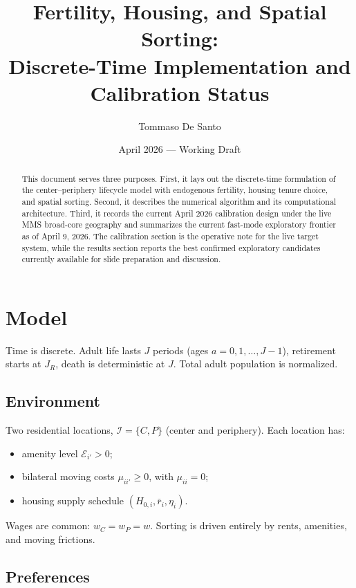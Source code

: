 \documentclass[11pt]{article}
\title{Fertility, Housing, and Spatial Sorting:\\Discrete-Time Implementation and Calibration Status}
\author{Tommaso De Santo}
\date{April 2026 --- Working Draft}
\begin{document}
\maketitle

\begin{abstract}
This document serves three purposes. First, it lays out the discrete-time formulation of the center--periphery lifecycle model with endogenous fertility, housing tenure choice, and spatial sorting. Second, it describes the numerical algorithm and its computational architecture. Third, it records the current April 2026 calibration design under the live MMS broad-core geography and summarizes the current fast-mode exploratory frontier as of April 9, 2026. The calibration section is the operative note for the live target system, while the results section reports the best confirmed exploratory candidates currently available for slide preparation and discussion.
\end{abstract}

\tableofcontents
\newpage

\section{Model}

Time is discrete. Adult life lasts $J$ periods (ages $a=0,1,\ldots,J-1$), retirement starts at $J_R$, death is deterministic at $J$. Total adult population is normalized.

\subsection{Environment}

Two residential locations, $\mathcal I = \{C,P\}$ (center and periphery). Each location has:
\begin{itemize}[leftmargin=*]
	\item amenity level $\mathcal{E}_{i'} > 0$;
	\item bilateral moving costs $\mu_{ii'} \ge 0$, with $\mu_{ii}=0$;
	\item housing supply schedule $(H_{0,i},\bar r_i,\eta_i)$.
\end{itemize}
Wages are common: $w_C = w_P = w$. Sorting is driven entirely by rents, amenities, and moving frictions.

\subsection{Preferences}
\end{document}
